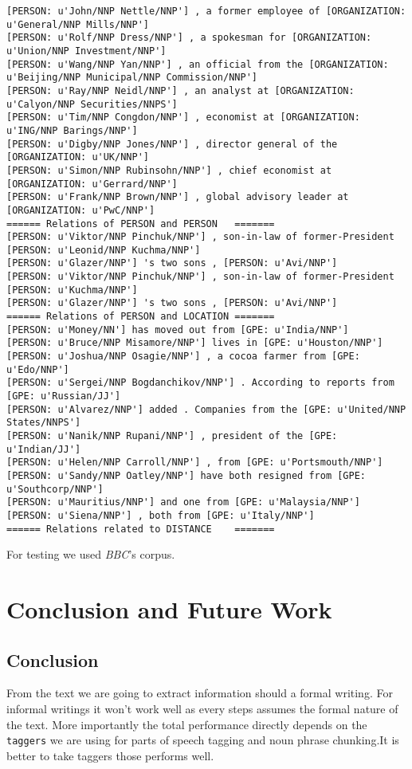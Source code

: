 \documentclass[12pt]{report}
\begin{document}
\begin{scriptsize}
\begin{verbatim}
[PERSON: u'John/NNP Nettle/NNP'] , a former employee of [ORGANIZATION: u'General/NNP Mills/NNP']
[PERSON: u'Rolf/NNP Dress/NNP'] , a spokesman for [ORGANIZATION: u'Union/NNP Investment/NNP']
[PERSON: u'Wang/NNP Yan/NNP'] , an official from the [ORGANIZATION: u'Beijing/NNP Municipal/NNP Commission/NNP']
[PERSON: u'Ray/NNP Neidl/NNP'] , an analyst at [ORGANIZATION: u'Calyon/NNP Securities/NNPS']
[PERSON: u'Tim/NNP Congdon/NNP'] , economist at [ORGANIZATION: u'ING/NNP Barings/NNP']
[PERSON: u'Digby/NNP Jones/NNP'] , director general of the [ORGANIZATION: u'UK/NNP']
[PERSON: u'Simon/NNP Rubinsohn/NNP'] , chief economist at [ORGANIZATION: u'Gerrard/NNP']
[PERSON: u'Frank/NNP Brown/NNP'] , global advisory leader at [ORGANIZATION: u'PwC/NNP']
====== Relations of PERSON and PERSON	=======
[PERSON: u'Viktor/NNP Pinchuk/NNP'] , son-in-law of former-President [PERSON: u'Leonid/NNP Kuchma/NNP']
[PERSON: u'Glazer/NNP'] 's two sons , [PERSON: u'Avi/NNP']
[PERSON: u'Viktor/NNP Pinchuk/NNP'] , son-in-law of former-President [PERSON: u'Kuchma/NNP']
[PERSON: u'Glazer/NNP'] 's two sons , [PERSON: u'Avi/NNP']
====== Relations of PERSON and LOCATION	=======
[PERSON: u'Money/NN'] has moved out from [GPE: u'India/NNP']
[PERSON: u'Bruce/NNP Misamore/NNP'] lives in [GPE: u'Houston/NNP']
[PERSON: u'Joshua/NNP Osagie/NNP'] , a cocoa farmer from [GPE: u'Edo/NNP']
[PERSON: u'Sergei/NNP Bogdanchikov/NNP'] . According to reports from [GPE: u'Russian/JJ']
[PERSON: u'Alvarez/NNP'] added . Companies from the [GPE: u'United/NNP States/NNPS']
[PERSON: u'Nanik/NNP Rupani/NNP'] , president of the [GPE: u'Indian/JJ']
[PERSON: u'Helen/NNP Carroll/NNP'] , from [GPE: u'Portsmouth/NNP']
[PERSON: u'Sandy/NNP Oatley/NNP'] have both resigned from [GPE: u'Southcorp/NNP']
[PERSON: u'Mauritius/NNP'] and one from [GPE: u'Malaysia/NNP']
[PERSON: u'Siena/NNP'] , both from [GPE: u'Italy/NNP']
====== Relations related to DISTANCE	=======
\end{verbatim}
\end{scriptsize}

\par For testing we used \textit{BBC}'s corpus.

\chapter{Conclusion and Future Work}
\section{Conclusion}
\par From the text we are going to extract information should a formal writing. For informal
 writings it won't work well as every steps assumes the formal nature of the text.
 More importantly the total performance directly depends on the \texttt{taggers} we are using
  for parts of speech tagging and noun phrase chunking.It is better to take taggers those
   performs well.
\end{document}
